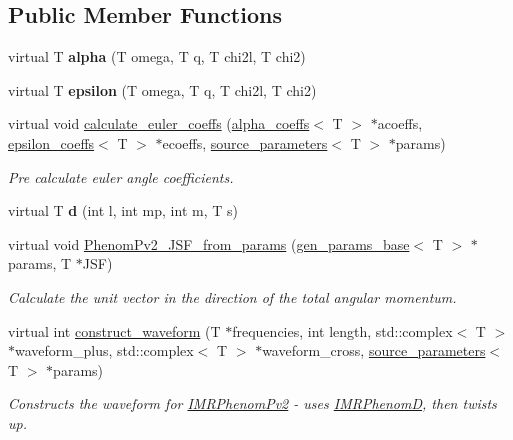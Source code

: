 \subsection*{Public Member Functions}
\begin{DoxyCompactItemize}
\item 
\mbox{\label{classIMRPhenomPv2_ae3a484c9f30a94cde0fd996e164e1f7d}} 
virtual T {\bfseries alpha} (T omega, T q, T chi2l, T chi2)
\item 
\mbox{\label{classIMRPhenomPv2_a5fff973809492fa59aff6d7d44a2b37a}} 
virtual T {\bfseries epsilon} (T omega, T q, T chi2l, T chi2)
\item 
virtual void \hyperlink{classIMRPhenomPv2_afc0f88c773f46ab060482bc530f60115}{calculate\+\_\+euler\+\_\+coeffs} (\hyperlink{structalpha__coeffs}{alpha\+\_\+coeffs}$<$ T $>$ $\ast$acoeffs, \hyperlink{structepsilon__coeffs}{epsilon\+\_\+coeffs}$<$ T $>$ $\ast$ecoeffs, \hyperlink{structsource__parameters}{source\+\_\+parameters}$<$ T $>$ $\ast$params)
\begin{DoxyCompactList}\small\item\em Pre calculate euler angle coefficients. \end{DoxyCompactList}\item 
\mbox{\label{classIMRPhenomPv2_a61b485a13745066477875a4b192dd940}} 
virtual T {\bfseries d} (int l, int mp, int m, T s)
\item 
virtual void \hyperlink{classIMRPhenomPv2_a9c81435792ee35948b3e7b3438c1ef1e}{Phenom\+Pv2\+\_\+\+J\+S\+F\+\_\+from\+\_\+params} (\hyperlink{classgen__params__base}{gen\+\_\+params\+\_\+base}$<$ T $>$ $\ast$params, T $\ast$J\+SF)
\begin{DoxyCompactList}\small\item\em Calculate the unit vector in the direction of the total angular momentum. \end{DoxyCompactList}\item 
virtual int \hyperlink{classIMRPhenomPv2_af147bf8756311a9386b3f9bcdefa7dd5}{construct\+\_\+waveform} (T $\ast$frequencies, int length, std\+::complex$<$ T $>$ $\ast$waveform\+\_\+plus, std\+::complex$<$ T $>$ $\ast$waveform\+\_\+cross, \hyperlink{structsource__parameters}{source\+\_\+parameters}$<$ T $>$ $\ast$params)
\begin{DoxyCompactList}\small\item\em Constructs the waveform for \hyperlink{classIMRPhenomPv2}{I\+M\+R\+Phenom\+Pv2} -\/ uses \hyperlink{classIMRPhenomD}{I\+M\+R\+PhenomD}, then twists up. \end{DoxyCompactList}\item 

\end{DoxyCompactItemize}
